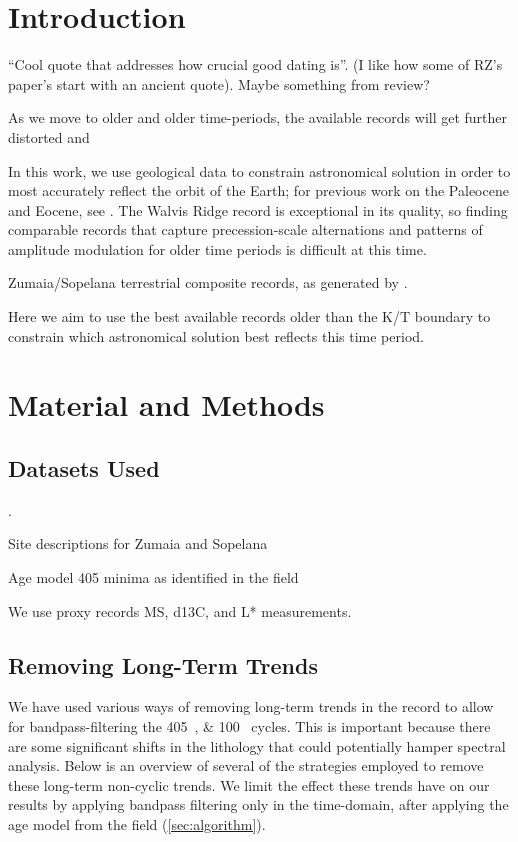 \documentclass[draft]{agujournal2019}
\begin{document}
\section{Introduction}\label{sec:intro}
``Cool quote that addresses how crucial good dating is''. (I like how some of
RZ's paper's start with an ancient quote). Maybe something from
 review?

As we move to older and older time-periods, the available records will get
further distorted and

In this work, we use geological data to constrain astronomical solution in
order to most accurately reflect the orbit of the Earth; for previous work on
the Paleocene and Eocene, see .
The Walvis Ridge record is exceptional in its quality, so finding comparable
records that capture precession-scale alternations and patterns of amplitude
modulation for older time periods is difficult at this time.

Zumaia/Sopelana terrestrial composite records, as generated by
.

Here we aim to use the best available records older than the K/T boundary to
constrain which astronomical solution best reflects this time period.


\section{Material and Methods}\label{sec:mm}

\subsection{Datasets Used}\label{sec:data}
.

Site descriptions for Zumaia and Sopelana

Age model \qty{405}{\kiloyear} minima as identified in the field

We use proxy records \gls{MS}, \gls{d13C}, and \gls{L*} measurements.

\subsection{Removing Long-Term Trends}\label{sec:detrend}

We have used various ways of removing long-term trends in the record to allow
for bandpass-filtering the \qtylist{405;100}{\kiloyear} cycles.
This is important because there are some significant shifts in the lithology
that could potentially hamper spectral analysis.
Below is an overview of several of the strategies employed to remove these
long-term non-cyclic trends.
We limit the effect these trends have on our results by applying bandpass
filtering only in the time-domain, after applying the age model from the field
(\cref{sec:algorithm}).
\end{document}
